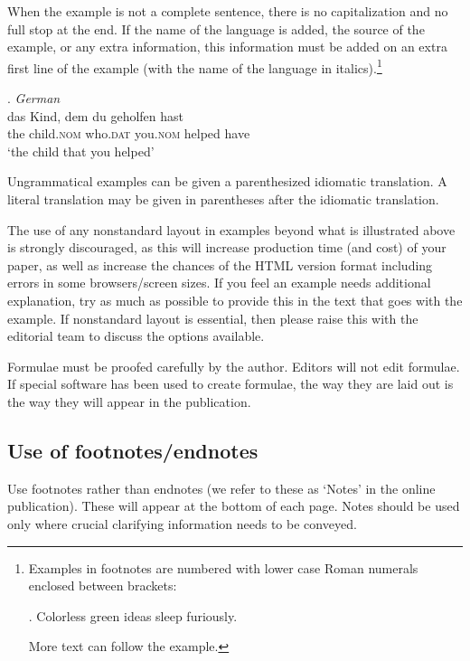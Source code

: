 \documentclass[charis,linguex]{glossa}
\begin{document}
When the example is not a complete sentence, there is no capitalization and no full stop at the end. If the name of the language is added, the source of the example, or any extra information, this information must be added on an extra first line of the example (with the name of the language in italics).\footnote{Examples in footnotes are numbered with lower case Roman numerals enclosed between brackets:

\ex. Colorless green ideas sleep furiously.

More text can follow the example.}

\ex. \textit{German} \citep{coetsem:2000}\\ %
\gll das Kind, dem du geholfen hast\\  %
the child.\textsc{nom} who.\textsc{dat} you.\textsc{nom}  helped have\\ %
\glt `the child that you helped' %

Ungrammatical examples can be given a parenthesized idiomatic translation. A literal translation may be given in parentheses after the idiomatic translation.

The use of any nonstandard layout in examples beyond what is illustrated above is strongly discouraged, as this will increase production time (and cost) of your paper, as well as increase the chances of the HTML version format including errors in some browsers/screen sizes. If you feel an example needs additional explanation, try as much as possible to provide this in the text that goes with the example. If nonstandard layout is essential, then please raise this with the editorial team to discuss the options available.

Formulae must be proofed carefully by the author. Editors will not edit formulae. If special software has been used to create formulae, the way they are laid out is the way they will appear in the publication.

\subsection{Use of footnotes/endnotes}\label{fn}

Use footnotes rather than endnotes (we refer to these as ‘Notes’ in the online publication). These will appear at the bottom of each page. Notes should be used only where crucial clarifying information needs to be conveyed. 
\end{document}
